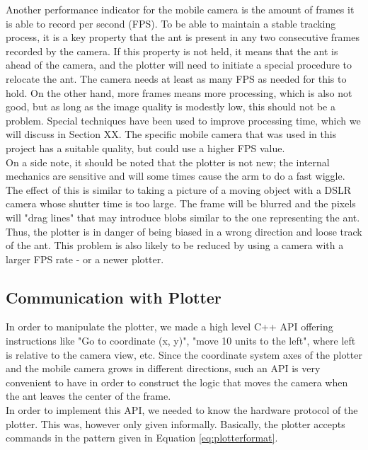 Another performance indicator for the mobile camera is the amount of frames it is able to record per second (FPS). To be able to maintain a stable tracking process, it is a key property that the ant is present in any two consecutive frames recorded by the camera. If this property is not held, it means that the ant is ahead of the camera, and the plotter will need to initiate a special procedure to relocate the ant. The camera needs at least as many FPS as needed for this to hold. On the other hand, more frames means more processing, which is also not good, but as long as the image quality is modestly low, this should not be a problem. Special techniques have been used to improve processing time, which we will discuss in Section XX. The specific mobile camera that was used in this project has a suitable quality, but could use a higher FPS value. \\

On a side note, it should be noted that the plotter is not new; the internal mechanics are sensitive and will some times cause the arm to do a fast wiggle. The effect of this is similar to taking a picture of a moving object with a DSLR camera whose shutter time is too large. The frame will be blurred and the pixels will "drag lines" that may introduce blobs similar to the one representing the ant. Thus, the plotter is in danger of being biased in a wrong direction and loose track of the ant. This problem is also likely to be reduced by using a camera with a larger FPS rate - or a newer plotter. \\

\subsection{Communication with Plotter}
In order to manipulate the plotter, we made a high level C++ API offering instructions like "Go to coordinate (x, y)", "move 10 units to the left", where left is relative to the camera view, etc. Since the coordinate system axes of the plotter and the mobile camera grows in different directions, such an API is very convenient to have in order to construct the logic that moves the camera when the ant leaves the center of the frame. \\

In order to implement this API, we needed to know the hardware protocol of the plotter. This was, however only given informally. Basically, the plotter accepts commands in the pattern given in Equation \ref{eq:plotterformat}.


